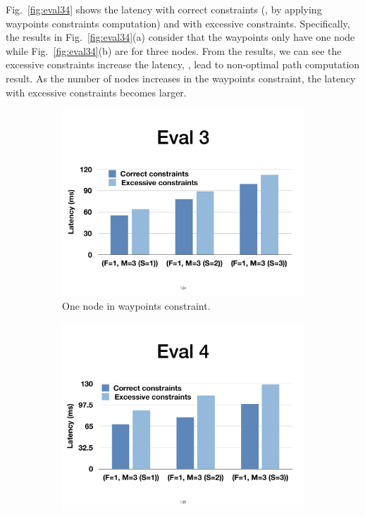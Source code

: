 Fig.~\ref{fig:eval34} shows the latency with correct constraints (\ie, by
applying waypoints constraints computation) and with excessive constraints.
Specifically, the results in Fig.~\ref{fig:eval34}(a) consider that the
waypoints only have one node while Fig.~\ref{fig:eval34}(b) are for three nodes.
From the results, we can see the excessive constraints increase the latency,
\ie, lead to non-optimal path computation result. As the number of nodes
increases in the waypoints constraint, the latency with excessive constraints becomes larger.

\begin{figure}[!htbp]
\centering
\begin{subfigure}{0.48\linewidth}
      \centering\includegraphics[width=\linewidth]{figures/ss-eval3.pdf}
      \caption{\label{fig:eval3} \small One node in waypoints constraint.}
\end{subfigure}
\begin{subfigure}{0.48\linewidth}
      \centering\includegraphics[width=\linewidth]{figures/ss-eval4.pdf}

\end{subfigure}
\end{figure}
